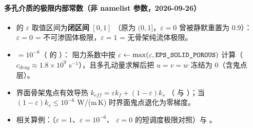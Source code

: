 \paragraph{多孔介质的极限内部常数（非 namelist 参数，2026-09-26）}
\begin{itemize}
  \item {} 的 $\varepsilon$ 取值区间为\textbf{闭区间} $[0,1]$
        （原为 $(0,1]$，$\varepsilon=0$ 曾被静默重置为 0.9）：
        $\varepsilon=0$ = 不可渗固体极限，$\varepsilon=1$ = 无骨架纯流体极限。
  \item {} $=10^{-8}$（ 的 ）：
        阻力系数中按 $\varepsilon\leftarrow\max(\varepsilon,\texttt{EPS\_SOLID\_POROUS})$
        计算（$c_{drag}\approx1.8\times10^{9}$ s$^{-1}$），且多孔动量求解后把
        $u=v=w$ 冻结为 0（含鬼点层）。
  \item 界面骨架鬼点有效导热 $k_{eff}=\varepsilon k_f+(1-\varepsilon)k_s$
        （ 与 ）；当
        $(1-\varepsilon)k_s\le10^{-6}$ W/(m\,K) 时界面鬼点退化为零梯度。
  \item 相关算例：（$\varepsilon=1$、$\varepsilon=10^{-6}$、
        $\varepsilon=0$ 的短调度极限对照）与 。
\end{itemize}

